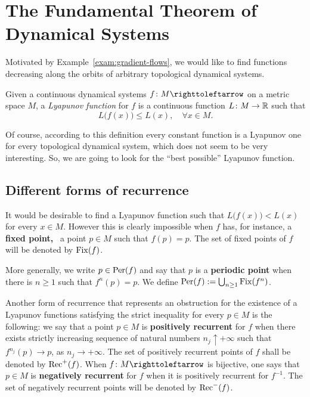 \section{The Fundamental Theorem of Dynamical Systems}\label{sec:fundamental-thm-dyn-sys}

Motivated by Example~\ref{exam:gradient-flows}, we would like to find functions decreasing along the orbits of arbitrary topological dynamical systems.

\begin{definition}
  Given a continuous dynamical systems $f\colon M\carr$ on a metric space $M$, a \emph{Lyapunov function} for $f$ is a continuous function $L\colon M\to\mathbb{R}$ such that
  \begin{displaymath}
    L\big(f(x)\big)\leq L(x), \quad\forall x\in M.
  \end{displaymath}
\end{definition}

Of course, according to this definition every constant function is a Lyapunov one for every topological dynamical system, which does not seem to be very interesting. So, we are going to look for the ``best possible'' Lyapunov function.

\subsection{Different forms of recurrence}\label{sec:forms-of-recurrence}

It would be desirable to find a Lyapunov function such that $L\big(f(x)\big)<L(x)$ for every $x\in M$. However this is clearly impossible when $f$ has, for instance, a \textbf{fixed point,} \ie~a point $p\in M$ such that $f(p)=p$. The set of fixed points of $f$ will be denoted by $\operatorname{Fix}(f)$.

More generally, we write $p\in\operatorname{Per}(f)$ and say that $p$ is a \textbf{periodic point} when there is $n\geq 1$ such that $f^{n}(p)=p$. We define $\operatorname{Per}(f):=\bigcup_{n\geq 1}\operatorname{Fix}(f^{n})$.

Another form of recurrence that represents an obstruction for the existence of a Lyapunov functions satisfying the strict inequality for every $p\in M$ is the following: we say that a point $p\in M$ is \textbf{positively recurrent} for $f$ when there exists strictly increasing sequence of natural numbers $n_{j}\uparrow+\infty$ such that $f^{n_{j}}(p)\to p$, as $n_{j}\to+\infty$. The set of positively recurrent points of $f$ shall be denoted by $\mathrm{Rec}^+(f)$. When $f\colon M\carr$ is bijective, one says that $p\in M$ is \textbf{negatively recurrent} for $f$ when it is positively recurrent for $f^{-1}$. The set of negatively recurrent points will be denoted by $\mathrm{Rec}^-(f)$.

